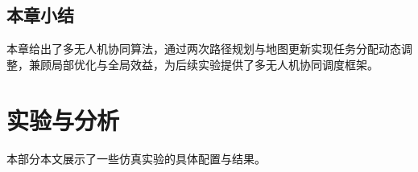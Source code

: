 \documentclass[AutoFakeBold]{LZUThesis}
\begin{document}





\section{本章小结}
本章给出了多无人机协同算法，通过两次路径规划与地图更新实现任务分配动态调整，兼顾局部优化与全局效益，为后续实验提供了多无人机协同调度框架。

\chapter{实验与分析}
本部分本文展示了一些仿真实验的具体配置与结果。
\label{sub:实验配置表格}
\end{document}
